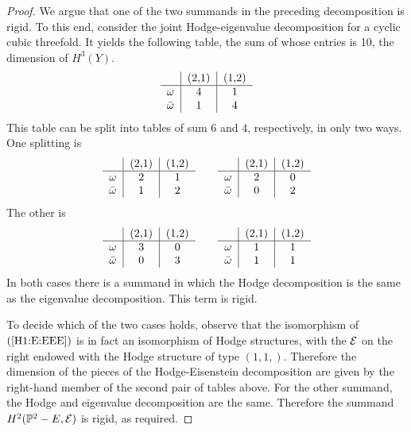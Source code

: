 \documentclass[11pt]{amsart}
\begin{document}
\begin{proof}
We argue that  one of the two summands
in the preceding decomposition is rigid.  To this end, consider
the joint Hodge-eigenvalue decomposition for a cyclic cubic
threefold.  It yields  the following table, the sum of whose
entries is 10, the dimension of $H^3(Y)$.
\[
\begin{tabular}{l|c|c}
 & (2,1) & (1,2) \\  \hline
 $\omega$ & 4 & 1 \\
 $\bar\omega$ & 1 & 4 
 \end{tabular}
 \]
This table can be split into tables of sum 6 and 4,
respectively, in only two ways. One splitting is
\[
\begin{tabular}{l|c|c}
 & (2,1) & (1,2) \\  \hline
 $\omega$ & 2 & 1 \\
 $\bar\omega$ & 1 & 2 
 \end{tabular}
 \qquad 
 \begin{tabular}{l|c|c}
 & (2,1) & (1,2) \\  \hline
 $\omega$ & 2 & 0 \\
 $\bar\omega$ & 0 & 2 
 \end{tabular}
 \]
The other is
\[
\begin{tabular}{l|c|c}
 & (2,1) & (1,2) \\  \hline
 $\omega$ & 3 & 0 \\
 $\bar\omega$ & 0 & 3 
 \end{tabular}
 \qquad 
 \begin{tabular}{l|c|c}
 & (2,1) & (1,2) \\  \hline
 $\omega$ & 1 & 1 \\
 $\bar\omega$ & 1 & 1 
 \end{tabular}
 \]
In both cases there is a summand
in which the Hodge decomposition is the same
as the eigenvalue decomposition.  This  
term is rigid.  

To decide which of the two cases holds, 
observe that the isomorphism of $(\ref{H1:E:EEE})$ is
in fact an isomorphism of Hodge structures, with the
${\mathcal E}$ on the right endowed with the Hodge structure
of type $(1,1,)$.  Therefore the dimension of the pieces of the  Hodge-Eisenstein decomposition
are given by the right-hand member of the second pair of tables above.
For the other summand, the Hodge and eigenvalue decomposition
are the same.  Therefore the summand $H^2({\mathbb P}^2 - E, {\mathcal E})$
is rigid, as required.
\end{proof} 
 
\end{document}
